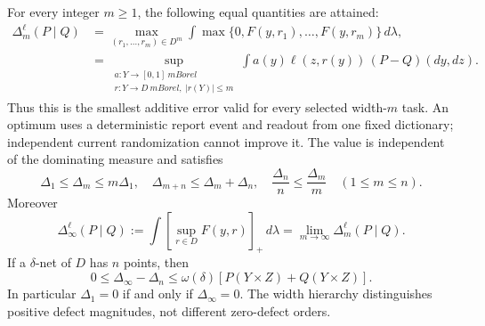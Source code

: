 \begin{theorem}\label{thm:width-defect}
For every integer $m\ge1$, the following equal quantities are attained:
\begin{align}
 \Delta_m^\ell(P\mid Q)&=\max_{(r_1,\ldots,r_m)\in D^m}
 \int\max\{0,F(y,r_1),\ldots,F(y,r_m)\}\,d\lambda,
 \label{eq:defect-envelope}\\
 &=\sup_{\substack{a:Y\to[0,1]\ {
m Borel}\\r:Y\to D\ {
m Borel},\ |r(Y)|\le m}}
       \int a(y)\ell(z,r(y))\,(P-Q)(dy,dz).
 \label{eq:defect-tests}
\end{align}
Thus this is the smallest additive error valid for every selected width-$m$ task. An optimum uses a deterministic report event and readout from one fixed dictionary; independent current randomization cannot improve it. The value is independent of the dominating measure and satisfies
\begin{equation}\label{eq:width-growth}
 \Delta_1\le\Delta_m\le m\Delta_1,\quad
 \Delta_{m+n}\le\Delta_m+\Delta_n,\quad
 \frac{\Delta_n}{n}\le\frac{\Delta_m}{m}\quad(1\le m\le n).
\end{equation}
Moreover
\begin{equation}\label{eq:infinite-defect}
 \Delta_\infty^\ell(P\mid Q):=\int[\sup_{r\in D}F(y,r)]_+\,d\lambda
       =\lim_{m\to\infty}\Delta_m^\ell(P\mid Q).
\end{equation}
If a $\delta$-net of $D$ has $n$ points, then
\begin{equation}\label{eq:defect-net}
 0\le\Delta_\infty-\Delta_n\le
 \omega(\delta)[P(Y\times Z)+Q(Y\times Z)].
\end{equation}
In particular $\Delta_1=0$ if and only if $\Delta_\infty=0$. The width hierarchy distinguishes positive defect magnitudes, not different zero-defect orders.
\end{theorem}
